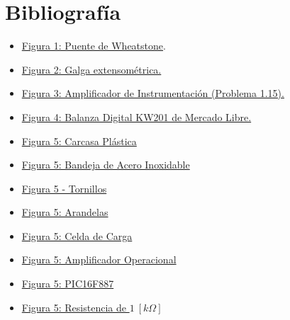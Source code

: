 \documentclass[12pt,a4paper]{article}
\begin{document}
\section{Bibliografía}
\begin{itemize}
    \item \href{https://www.straingauges.cl/blog-details}{Figura 1: Puente de Wheatstone}.
    \item \href{https://www.flintec.com/es/aprender/sensor-de-peso/celulas-de-carga}{Figura 2: Galga extensométrica.}
    \item \href{https://fcefyn.aulavirtual.unc.edu.ar/pluginfile.php/951691/mod_resource/content/1/Gu%C3%ADa%20de%20Problemas%20Sintesis%20Redes%20Activas%202025.pdf}{Figura 3: Amplificador de Instrumentación (Problema 1.15).}
    \item \href{https://www.mercadolibre.com.ar/balanza-digital-de-cocina-tanita-kw201-impermeable-nuevo/up/MLAU2869583515#polycard_client=search-nordic&search_layout=stack&position=45&type=product&tracking_id=5a856d4c-e98f-4b43-b193-1b280af08bbe&wid=MLA1968676040&sid=search}{Figura 4: Balanza Digital KW201 de Mercado Libre.}
    \item \href{https://www.digikey.com/es/products/detail/bud-industries/CU-1941/439228}{Figura 5: Carcasa Plástica}
    \item \href{https://www.mercadolibre.com.ar/chapa-acero-inoxidable-aisi-304/up/MLAU201997383?matt_tool=38087446&utm_source=google_shopping&utm_medium=organic&pdp_filters=item_id:MLA899064590}{Figura 5: Bandeja de Acero Inoxidable}
    \item \href{https://www.digikey.com/es/products/detail/keystone-electronics/9900/317321}{Figura 5 - Tornillos}
    \item \href{https://www.digikey.com/es/products/detail/te-connectivity-amp-connectors/21124-8/13985149}{Figura 5: Arandelas}
    \item \href{https://www.digikey.com/es/products/detail/adafruit-industries-llc/4541/12323573}{Figura 5: Celda de Carga}
    \item \href{https://www.digikey.com/es/products/detail/texas-instruments/LM324N/277627}{Figura 5: Amplificador Operacional}
    \item \href{https://www.digikey.com/es/products/detail/microchip-technology/PIC16F887-I-P/1015608}{Figura 5: PIC16F887}
    \item \href{https://www.digikey.com/es/products/detail/stackpole-electronics-inc/RNF14DBD1K00/17511389}{Figura 5: Resistencia de $1 \ [k \Omega]$}

\end{itemize}
\end{document}

